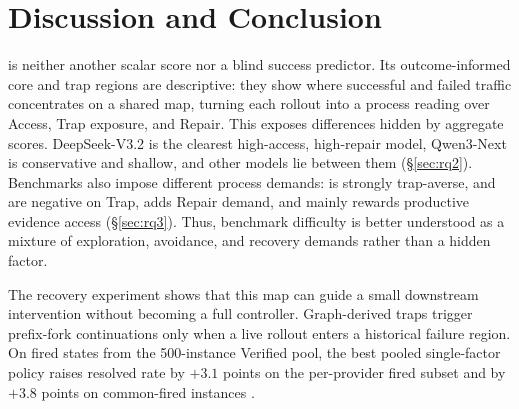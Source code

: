 \section{Discussion and Conclusion}
\label{sec:discussion}

\method{} is neither another scalar score nor a blind success predictor.
Its outcome-informed core and trap regions are descriptive: they show where successful and failed traffic concentrates on a shared map, turning each rollout into a process reading over Access, Trap exposure, and Repair.
This exposes differences hidden by aggregate scores.
DeepSeek-V3.2 is the clearest high-access, high-repair model, Qwen3-Next is conservative and shallow, and other models lie between them (\S\ref{sec:rq2}).
Benchmarks also impose different process demands: \taub{} is strongly trap-averse, \mcp{} and \terminal{} are negative on Trap, \swe{} adds Repair demand, and \searchb{} mainly rewards productive evidence access (\S\ref{sec:rq3}).
Thus, benchmark difficulty is better understood as a mixture of exploration, avoidance, and recovery demands rather than a hidden factor.

The recovery experiment shows that this map can guide a small downstream intervention without becoming a full controller.
Graph-derived traps trigger prefix-fork continuations only when a live \swe{} rollout enters a historical failure region.
On fired states from the 500-instance \swe{} Verified pool, the best pooled single-factor policy raises resolved rate by $+3.1$ points on the per-provider fired subset and by $+3.8$ points on common-fired instances .
